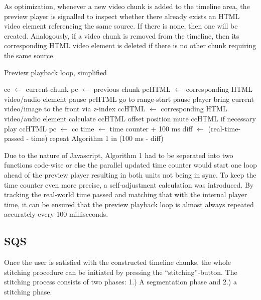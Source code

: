 \documentclass[conference]{IEEEtran}
\begin{document}
As optimization, whenever a new video chunk is added to the timeline area, the preview player is signalled to inspect whether there already exists an HTML video element referencing the same source.
If there is none, then one will be created.
Analogously, if a video chunk is removed from the timeline, then its corresponding HTML video element is deleted if there is no other chunk requiring the same source.
\begin{algorithm}[H]
\caption{Preview playback loop, simplified}
	\begin{algorithmic}[1]
		\STATE cc $\gets$ current chunk
		\STATE pc $\gets$ previous chunk
		\STATE pcHTML $\gets$ corresponding HTML video/audio element
		\STATE pause pcHTML
		\ENDIF
		\STATE go to range-start
		\ELSE
		\STATE pause player
		\RETURN
		\ENDIF
		\ENDIF
		\STATE bring current video/image to the front via z-index
		\STATE ccHTML $\gets$ corresponding HTML video/audio element
		\STATE calculate ccHTML offset position
		\STATE mute ccHTML if necessary
		\STATE play ccHTML
		\ENDIF
		\STATE pc $\gets$ cc
		\STATE time $\gets$ time counter + 100 ms
		\STATE diff $\gets$ (real-time-passed - time)
		\STATE repeat Algorithm 1 in (100 ms - diff)
	\end{algorithmic}
\end{algorithm}
Due to the nature of Javascript, Algorithm 1 had to be seperated into two functions code-wise or else the parallel updated time counter would start one loop ahead of the preview player resulting in both units not being in sync.
To keep the time counter even more precise, a self-adjustment calculation was introduced. By tracking the real-world time passed and matching that with the internal player time, it can be ensured that the preview playback loop is almost always repeated accurately every 100 milliseconds.

\subsection{SQS}
Once the user is satisfied with the constructed timeline chunks, the whole stitching procedure can be initiated by pressing the ``stitching''-button.
The stitching process consists of two phases: 1.) A segmentation phase and 2.) a stitching phase.
\end{document}
